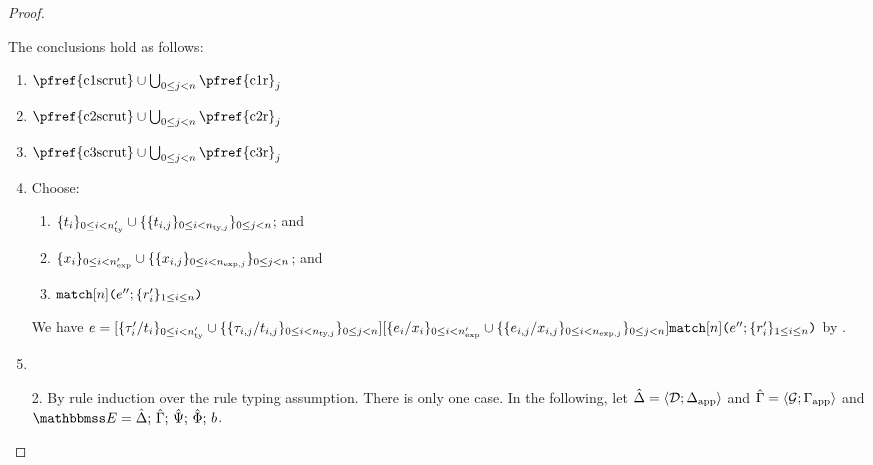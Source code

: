 \begin{proof}
\begin{enumerate}
\begin{grayparbox}
\begin{byCases}
  The conclusions hold as follows:
  \begin{enumerate}
    \item $\text{\pfref{c1scrut}} \cup \bigcup_{0 \leq j < \nrules} \text{\pfref{c1r}}_j$
    \item $\text{\pfref{c2scrut}} \cup \bigcup_{0 \leq j < \nrules} \text{\pfref{c2r}}_j$
    \item $\text{\pfref{c3scrut}} \cup \bigcup_{0 \leq j < \nrules} \text{\pfref{c3r}}_j$
    \item Choose:
      \begin{enumerate}
      \item $\{t_i\}_{0 \leq i < n_\text{ty}'} \cup \{ \{t_{i,j}\}_{0 \leq i < n_\text{ty,$j$}} \}_{0 \leq j < n}$; and
      \item $\{x_i\}_{0 \leq i < n_\text{exp}'} \cup \{ \{x_{i,j}\}_{0 \leq i < n_\text{exp,$j$}} \}_{0 \leq j < n}$; and 
      \item $\texttt{match}[n]\texttt{(}e''; \{r'_{i}\}_{1 \leq i \leq n}\texttt{)}$
      \end{enumerate}
      We have $e = [\{\tau'_i/t_i\}_{0 \leq i < n_\text{ty}'} \cup \{ \{\tau_{i,j}/t_{i,j}\}_{0 \leq i < n_\text{ty,$j$}} \}_{0 \leq j < n}][\{e_i/x_i\}_{0 \leq i < n_\text{exp}'} \cup \{ \{e_{i,j}/x_{i,j}\}_{0 \leq i < n_\text{exp,$j$}} \}_{0 \leq j < n}]\texttt{match}[n]\texttt{(}e''; \{r'_{i}\}_{1 \leq i \leq n}\texttt{)}$ by .
    \item {}
  \end{enumerate}
  \resetpfcounter
\end{byCases}
\end{grayparbox}
\end{enumerate}
\vspace{-2px}\begin{grayparbox}\vspace{2px}
\begin{enumerate}
\item[2.] By rule induction over the rule typing assumption. There is only one case. In the following, let $\hat{\Delta}=\langle \mathcal{D}; \Delta_\text{app} \rangle$ and $\hat{\Gamma}=\langle \mathcal{G}; \Gamma_\text{app} \rangle$ and $\escenev=\esceneUP{\uDelta}{\uGamma}{\uPsi}{\uPhi}{b}$.
\end{enumerate}
\end{grayparbox}
\end{proof}
